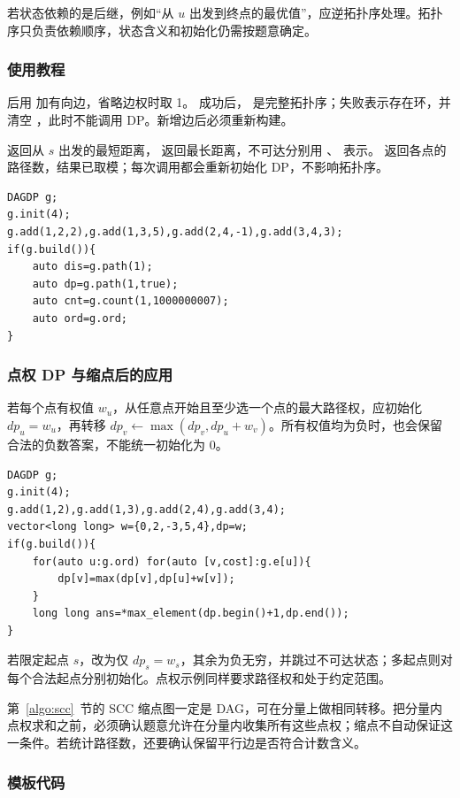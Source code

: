 若状态依赖的是后继，例如“从 $u$ 出发到终点的最优值”，应逆拓扑序处理。拓扑序只负责依赖顺序，状态含义和初始化仍需按题意确定。

\subsubsection*{使用教程}
 后用  加有向边，省略边权时取 1。 成功后， 是完整拓扑序；失败表示存在环，并清空 ，此时不能调用 DP。新增边后必须重新构建。

 返回从 $s$ 出发的最短距离， 返回最长距离，不可达分别用 、 表示。 返回各点的路径数，结果已取模；每次调用都会重新初始化 DP，不影响拓扑序。
\begin{lstlisting}[style=mtycpp,numbers=none]
DAGDP g;
g.init(4);
g.add(1,2,2),g.add(1,3,5),g.add(2,4,-1),g.add(3,4,3);
if(g.build()){
	auto dis=g.path(1);
	auto dp=g.path(1,true);
	auto cnt=g.count(1,1000000007);
	auto ord=g.ord;
}
\end{lstlisting}

\subsubsection*{点权 DP 与缩点后的应用}
若每个点有权值 $w_u$，从任意点开始且至少选一个点的最大路径权，应初始化 $dp_u=w_u$，再转移 $dp_v\gets\max(dp_v,dp_u+w_v)$。所有权值均为负时，也会保留合法的负数答案，不能统一初始化为 0。
\begin{lstlisting}[style=mtycpp,numbers=none]
DAGDP g;
g.init(4);
g.add(1,2),g.add(1,3),g.add(2,4),g.add(3,4);
vector<long long> w={0,2,-3,5,4},dp=w;
if(g.build()){
	for(auto u:g.ord) for(auto [v,cost]:g.e[u]){
		dp[v]=max(dp[v],dp[u]+w[v]);
	}
	long long ans=*max_element(dp.begin()+1,dp.end());
}
\end{lstlisting}
若限定起点 $s$，改为仅 $dp_s=w_s$，其余为负无穷，并跳过不可达状态；多起点则对每个合法起点分别初始化。点权示例同样要求路径权和处于约定范围。

第~\ref{algo:scc}~节的 SCC 缩点图一定是 DAG，可在分量上做相同转移。把分量内点权求和之前，必须确认题意允许在分量内收集所有这些点权；缩点不自动保证这一条件。若统计路径数，还要确认保留平行边是否符合计数含义。

\subsubsection*{模板代码}
